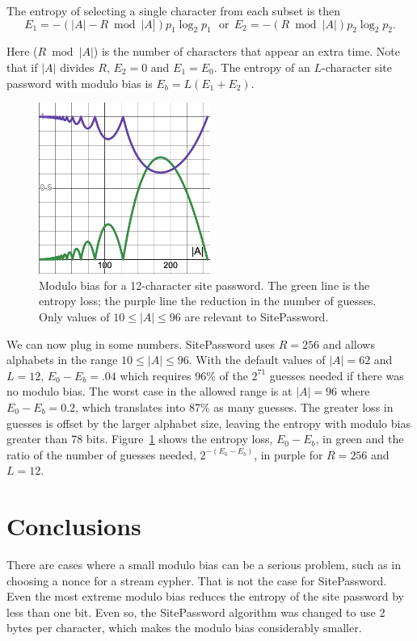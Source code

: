 \documentclass[11pt, oneside]{article}   	%
\begin{document}
The entropy of selecting a single character from each subset is then
\begin{equation}
E_1 = -(|A| - R \bmod |A]) p_1 \log_2 p_1 ~~~\textrm{or}~~ E_2 = - (R \bmod |A|) p_2 \log_2 p_2.
\end{equation}

Here ($R \bmod|A|$) is the number of characters that appear an extra time.  Note that if $|A|$ divides $R$, $E_2 = 0$ and $E_1 = E_0$.  The entropy of an $L$-character site password with modulo bias is $E_b = L(E_1 + E_2)$.  

\begin{figure}
    \centering
    \includegraphics[width=0.5\textwidth]{moduloBias.png} 
    \caption{Modulo bias for a 12-character site password.  The green line is the entropy loss; the purple line the reduction in the number of guesses.  Only values of $10 \leq |A| \leq 96$ are relevant to SitePassword.}
    \label{fig}
\end{figure}

We can now plug in some numbers.  SitePassword uses $R = 256$ and allows alphabets in the range $10 \leq |A| \leq 96$.  With the default values of $|A| = 62$ and $L = 12$, $E_0 - E_b = .04$ which requires 96\% of the $2^{71}$ guesses needed if there was no modulo bias.  The worst case in the allowed range is at $|A| = 96$ where $E_0 - E_b = 0.2$, which translates into 87\% as many guesses.  The greater loss in guesses is offset by the larger alphabet size, leaving the entropy with modulo bias greater than 78 bits.  Figure~\ref{fig} shows the entropy loss, $E_0 - E_b$, in green and the ratio of the number of guesses needed, $2^{-(E_0-E_b)}$, in purple for $R = 256$ and $L = 12$.

\section{Conclusions}

There are cases where a small modulo bias can be a serious problem, such as in choosing a nonce for a stream cypher.  That is not the case for SitePassword.  Even the most extreme modulo bias reduces the entropy of the site password by less than one bit.  Even so, the SitePassword algorithm was changed to use 2 bytes per character, which makes the modulo bias considerably smaller.
\end{document}
